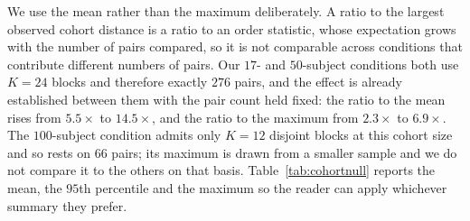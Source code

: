 We use the mean rather than the maximum deliberately. A ratio to the largest
observed cohort distance is a ratio to an order statistic, whose expectation
grows with the number of pairs compared, so it is not comparable across
conditions that contribute different numbers of pairs. Our $17$- and
$50$-subject conditions both use $K = 24$ blocks and therefore exactly $276$
pairs, and the effect is already established between them with the pair count
held fixed: the ratio to the mean rises from $5.5\times$ to $14.5\times$, and
the ratio to the maximum from $2.3\times$ to $6.9\times$. The $100$-subject
condition admits only $K = 12$ disjoint blocks at this cohort size and so rests
on $66$ pairs; its maximum is drawn from a smaller sample and we do not compare
it to the others on that basis. Table~\ref{tab:cohortnull} reports the mean,
the $95$th percentile and the maximum so the reader can apply whichever
summary they prefer.

